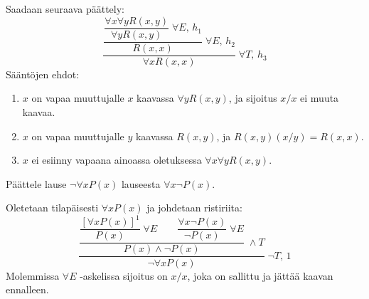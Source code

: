 \documentclass[11pt,a4paper]{amsart}
\begin{document}
\begin{solution}
  Saadaan seuraava päättely:
  \[
    \dfrac{
      \dfrac{
        \dfrac{\forall x\forall yR(x,y)}{\forall yR(x,y)}
        \;\forall E,\,h_1
      }{R(x,x)}\;\forall E,\,h_2
    }{\forall xR(x,x)}\;\forall T,\,h_3
  \]
  Sääntöjen ehdot:
  \leavevmode\par
  \begin{enumerate}[label={h\arabic*:}]
    \item \(x\) on vapaa muuttujalle \(x\) kaavassa \(\forall yR(x,y)\),
      ja sijoitus \(x/x\) ei muuta kaavaa.
    \item \(x\) on vapaa muuttujalle \(y\) kaavassa \(R(x,y)\),
      ja \(R(x,y)(x/y)=R(x,x)\).
    \item \(x\) ei esiinny vapaana ainoassa oletuksessa
      \(\forall x\forall yR(x,y)\).
  \end{enumerate}
\end{solution}

\begin{exercise}
  Päättele lause \(\neg\forall xP(x)\) lauseesta \(\forall x\neg P(x)\).
\end{exercise}

\begin{solution}
  Oletetaan tilapäisesti \(\forall xP(x)\) ja johdetaan ristiriita:
  \[
    \dfrac{
      \dfrac{
        \dfrac{[\forall xP(x)]^1}{P(x)}\;\forall E
        \qquad
        \dfrac{\forall x\neg P(x)}{\neg P(x)}\;\forall E
      }{P(x)\land\neg P(x)}\;\land T
    }{\neg\forall xP(x)}\;\neg T,\,1
  \]
  Molemmissa \(\forall E\) -askelissa sijoitus on \(x/x\), joka on
  sallittu ja jättää kaavan ennalleen.
\end{solution}
\end{document}
